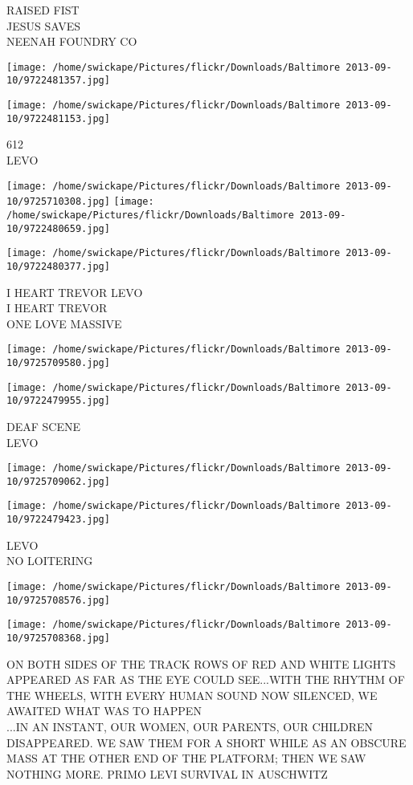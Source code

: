 \documentclass[10pt,letterpaper]{article}
\begin{document}
RAISED FIST\\
JESUS SAVES\\
NEENAH FOUNDRY CO
\pagebreak

\texttt{[image: /home/swickape/Pictures/flickr/Downloads/Baltimore 2013-09-10/9722481357.jpg]}

\vspace{0.25in}
\texttt{[image: /home/swickape/Pictures/flickr/Downloads/Baltimore 2013-09-10/9722481153.jpg]}

612\\
LEVO
\pagebreak

\texttt{[image: /home/swickape/Pictures/flickr/Downloads/Baltimore 2013-09-10/9725710308.jpg]}
\texttt{[image: /home/swickape/Pictures/flickr/Downloads/Baltimore 2013-09-10/9722480659.jpg]}

\texttt{[image: /home/swickape/Pictures/flickr/Downloads/Baltimore 2013-09-10/9722480377.jpg]}

I HEART TREVOR LEVO\\
I HEART TREVOR\\
ONE LOVE MASSIVE
\pagebreak

\texttt{[image: /home/swickape/Pictures/flickr/Downloads/Baltimore 2013-09-10/9725709580.jpg]}

\vspace{0.25in}
\texttt{[image: /home/swickape/Pictures/flickr/Downloads/Baltimore 2013-09-10/9722479955.jpg]}

DEAF SCENE\\
LEVO
\pagebreak

\texttt{[image: /home/swickape/Pictures/flickr/Downloads/Baltimore 2013-09-10/9725709062.jpg]}

\vspace{0.25in}
\texttt{[image: /home/swickape/Pictures/flickr/Downloads/Baltimore 2013-09-10/9722479423.jpg]}

LEVO\\
NO LOITERING
\pagebreak

\texttt{[image: /home/swickape/Pictures/flickr/Downloads/Baltimore 2013-09-10/9725708576.jpg]}

\vspace{0.25in}
\texttt{[image: /home/swickape/Pictures/flickr/Downloads/Baltimore 2013-09-10/9725708368.jpg]}

ON BOTH SIDES OF THE TRACK ROWS OF RED AND WHITE LIGHTS APPEARED AS FAR AS THE EYE COULD SEE...WITH THE RHYTHM OF THE WHEELS, WITH EVERY HUMAN SOUND NOW SILENCED, WE AWAITED WHAT WAS TO HAPPEN\\
...IN AN INSTANT, OUR WOMEN, OUR PARENTS, OUR CHILDREN DISAPPEARED.  WE SAW THEM FOR A SHORT WHILE AS AN OBSCURE MASS AT THE OTHER END OF THE PLATFORM; THEN WE SAW NOTHING MORE.  PRIMO LEVI  SURVIVAL IN AUSCHWITZ
\pagebreak
\end{document}
